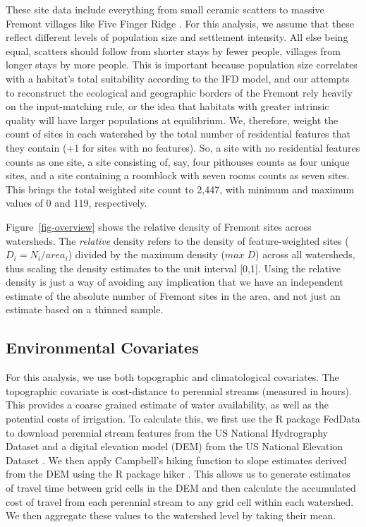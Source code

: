 \documentclass[
  number,
  preprint,
  3p]{elsarticle}
\begin{document}
These site data include everything from small ceramic scatters to
massive Fremont villages like Five Finger Ridge
\citep{janetski1998, janetski2000}. For this analysis, we assume that
these reflect different levels of population size and settlement
intensity. All else being equal, scatters should follow from shorter
stays by fewer people, villages from longer stays by more people. This
is important because population size correlates with a habitat's total
suitability according to the IFD model, and our attempts to reconstruct
the ecological and geographic borders of the Fremont rely heavily on the
input-matching rule, or the idea that habitats with greater intrinsic
quality will have larger populations at equilibrium. We, therefore,
weight the count of sites in each watershed by the total number of
residential features that they contain (+1 for sites with no features).
So, a site with no residential features counts as one site, a site
consisting of, say, four pithouses counts as four unique sites, and a
site containing a roomblock with seven rooms counts as seven sites. This
brings the total weighted site count to 2,447, with minimum and maximum
values of 0 and 119, respectively.

Figure~\ref{fig-overview} shows the relative density of Fremont sites
across watersheds. The \emph{relative} density refers to the density of
feature-weighted sites (\(D_i = N_i/area_i\)) divided by the maximum
density (\(max\;D\)) across all watersheds, thus scaling the density
estimates to the unit interval {[}0,1{]}. Using the relative density is
just a way of avoiding any implication that we have an independent
estimate of the absolute number of Fremont sites in the area, and not
just an estimate based on a thinned sample.

\hypertarget{environmental-covariates}{%
\subsection{Environmental Covariates}\label{environmental-covariates}}

For this analysis, we use both topographic and climatological
covariates. The topographic covariate is cost-distance to perennial
streams (measured in hours). This provides a coarse grained estimate of
water availability, as well as the potential costs of irrigation. To
calculate this, we first use the R package FedData \citep{bocinsky2020}
to download perennial stream features from the US National Hydrography
Dataset \citep{usgs2022} and a digital elevation model (DEM) from the US
National Elevation Dataset \citep{usgs2022a}. We then apply Campbell's
hiking function \citep{campbell2019} to slope estimates derived from the
DEM using the R package hiker \citep{vernon2021a}. This allows us to
generate estimates of travel time between grid cells in the DEM and then
calculate the accumulated cost of travel from each perennial stream to
any grid cell within each watershed. We then aggregate these values to
the watershed level by taking their mean.
\end{document}
